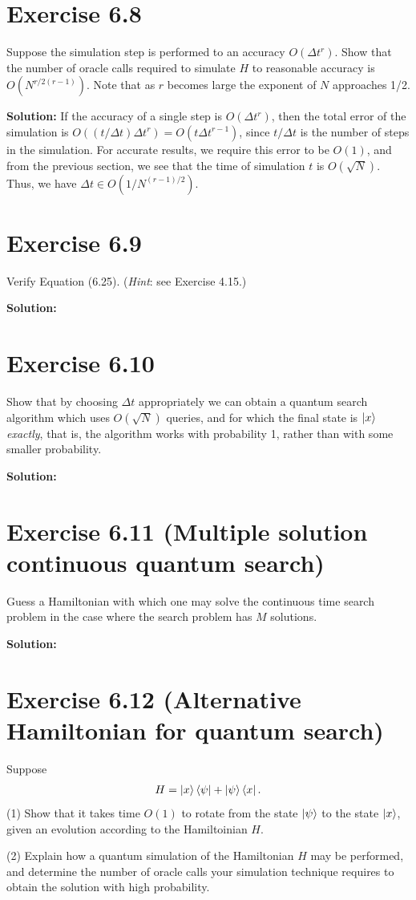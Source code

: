 \documentclass{book}
\begin{document}
    \section*{Exercise 6.8}
        Suppose the simulation step is performed to an accuracy $O(\Delta t^r)$. Show that the number of oracle calls required to simulate $H$ to reasonable accuracy is $O(N^{r/2(r-1)})$. Note that as $r$ becomes large the exponent of $N$ approaches 1/2.
        
        \textbf{Solution:} If the accuracy of a single step is $O(\Delta t^r)$, then the total error of the simulation is $O((t/\Delta t) \Delta t^r)=O(t\Delta t^{r-1})$, since $t/\Delta t$ is the number of steps in the simulation. For accurate results, we require this error to be $O(1)$, and from the previous section, we see that the time of simulation $t$ is $O(\sqrt{N})$. Thus, we have $\Delta t \in O(1/N^{(r-1)/2})$. 
    
    \section*{Exercise 6.9}
        Verify Equation (6.25). (\emph{Hint}: see Exercise 4.15.)
        
        \textbf{Solution:}
    
    \section*{Exercise 6.10}
        Show that by choosing $\Delta t$ appropriately we can obtain a quantum
        search algorithm which uses $O(\sqrt{N})$ queries, and for which the final state is $\ket{x}$ \emph{exactly}, that is, the algorithm works with probability 1, rather than with some smaller probability.
        
        \textbf{Solution:}
    
    \section*{Exercise 6.11 (Multiple solution continuous quantum search)}
        Guess a Hamiltonian with which one may solve the continuous time search problem in the case where the search problem has $M$ solutions.
        
        \textbf{Solution:}
    
    \section*{Exercise 6.12 (Alternative Hamiltonian for quantum search)}
        Suppose
        \begin{align}
            H = \ket{x}\bra{\psi}+\ket{\psi}\bra{x}.
        \end{align}
        (1) Show that it takes time $O(1)$ to rotate from the state $\ket{\psi}$ to the state $\ket{x}$, given an evolution according to the Hamiltoinian $H$. \par
        (2) Explain how a quantum simulation of the Hamiltonian $H$ may be performed, and determine the number of oracle calls your simulation technique requires to obtain the solution with high probability.
        
\end{document}
